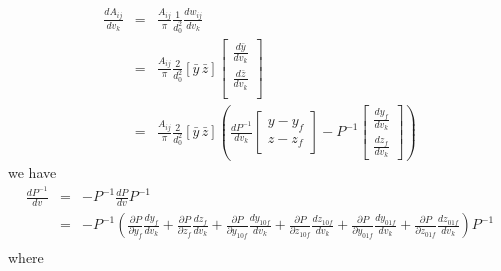 \documentclass{article}
\begin{document}
\begin{eqnarray}
   \frac{dA_{ij}}{dv_{k}} & = & \frac{A_{ij}}{\pi}\frac{1}{d_{0}^2}\frac{dw_{ij}}{dv_{k}}   \\
                          & = & \frac{A_{ij}}{\pi}\frac{2}{d_{0}^2}[\bar{y} \, \bar{z}]    
                                \left[ \begin{matrix}
                                      \frac{d\bar{y}}{dv_{k}}\\ \frac{d\bar{z}}{dv_{k}}\\
                                \end{matrix}  \right] \\ 
                          & = & \frac{A_{ij}}{\pi}\frac{2}{d_{0}^2}[\bar{y} \, \bar{z}] 
                                \left(
                                \frac{dP^{-1}}{dv_{k}}
                                   \left[\begin{matrix}
                                     y-y_{f}\\z-z_{f}
                                   \end{matrix}\right] - P^{-1}
                                   \left[\begin{matrix}
                                     \frac{dy_{f}}{dv_{k}}\\\frac{dz_{f}}{dv_{k}}
                                   \end{matrix}\right]
                            \right)
\end{eqnarray}
we have 
\begin{eqnarray}
  \frac{dP^{-1}}{dv} & = & -P^{-1}\frac{dP}{dv}P^{-1}\\
                     & = & -P^{-1}\left(
                            \frac{\partial{P}}{\partial{y_{f}}} \frac{dy_{f}}{dv_{k}}+ 
  			    \frac{\partial{P}}{\partial{z_{f}}} \frac{dz_{f}}{dv_{k}}+
 		     	    \frac{\partial{P}}{\partial{y_{10f}}} \frac{dy_{10f}}{dv_{k}}+ 
 	                    \frac{\partial{P}}{\partial{z_{10f}}} \frac{dz_{10f}}{dv_{k}}+
 			    \frac{\partial{P}}{\partial{y_{01f}}} \frac{dy_{01f}}{dv_{k}}+
 			    \frac{\partial{P}}{\partial{z_{01f}}} \frac{dz_{01f}}{dv_{k}}
                            \right)P^{-1}  \\
\end{eqnarray}
where
\end{document}
